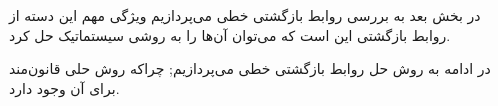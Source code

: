 
\p
در بخش بعد به بررسی روابط بازگشتی خطی می‌پردازیم
ویژگی مهم این دسته از روابط بازگشتی این است 
که می‌توان آن‌ها را به روشی سیستماتیک حل کرد.

در ادامه به روش حل روابط بازگشتی خطی می‌پردازیم; چراکه روش حلی قانون‌مند برای آن وجود دارد.


